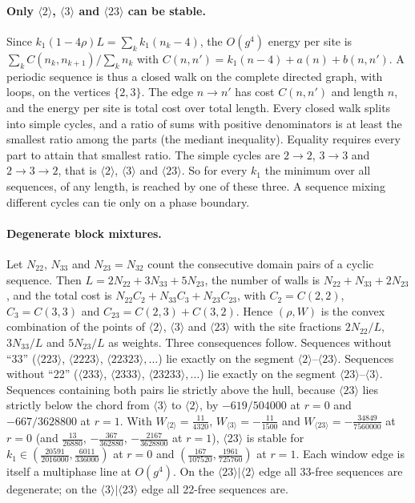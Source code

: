 \paragraph*{Only $\langle2\rangle$, $\langle3\rangle$ and $\langle23\rangle$ can be stable.}
Since $k_1(1-4\rho)L=\sum_k k_1(n_k-4)$, the $O(g^4)$ energy per site is $\sum_k C(n_k,n_{k+1})/\sum_k n_k$ with
$C(n,n')=k_1(n-4)+a(n)+b(n,n')$. A periodic sequence is thus a closed walk on the complete directed graph, with
loops, on the vertices $\{2,3\}$. The edge $n\to n'$ has cost $C(n,n')$ and length $n$, and the energy per site is
total cost over total length. Every closed walk splits into simple cycles, and a ratio of sums with positive
denominators is at least the smallest ratio among the parts (the mediant inequality). Equality requires every part
to attain that smallest ratio. The simple cycles are $2\to2$, $3\to3$ and $2\to3\to2$, that is $\langle2\rangle$,
$\langle3\rangle$ and $\langle23\rangle$. So for every $k_1$ the minimum over all sequences, of any length, is
reached by one of these three. A sequence mixing different cycles can tie only on a phase boundary.

\paragraph*{Degenerate block mixtures.}
Let $N_{22}$, $N_{33}$ and $N_{23}=N_{32}$ count the consecutive domain pairs of a cyclic sequence. Then
$L=2N_{22}+3N_{33}+5N_{23}$, the number of walls is $N_{22}+N_{33}+2N_{23}$, and the total cost is
$N_{22}C_{2}+N_{33}C_{3}+N_{23}C_{23}$, with $C_2=C(2,2)$, $C_3=C(3,3)$ and $C_{23}=C(2,3)+C(3,2)$. Hence
$(\rho,W)$ is the convex combination of the points of $\langle2\rangle$, $\langle3\rangle$ and $\langle23\rangle$
with the site fractions $2N_{22}/L$, $3N_{33}/L$ and $5N_{23}/L$ as weights. Three consequences follow.
Sequences without ``33'' ($\langle223\rangle$, $\langle2223\rangle$, $\langle22323\rangle,\dots$) lie exactly on the
segment $\langle2\rangle$--$\langle23\rangle$. Sequences without ``22'' ($\langle233\rangle$, $\langle2333\rangle$,
$\langle23233\rangle,\dots$) lie exactly on the segment $\langle23\rangle$--$\langle3\rangle$. Sequences containing
both pairs lie strictly above the hull, because $\langle23\rangle$ lies strictly below the chord from
$\langle3\rangle$ to $\langle2\rangle$, by $-619/504000$ at $r=0$ and $-667/3628800$ at $r=1$.
With $W_{\langle2\rangle}=\tfrac{11}{4320}$, $W_{\langle3\rangle}=-\tfrac{11}{1500}$ and
$W_{\langle23\rangle}=-\tfrac{34849}{7560000}$ at $r=0$ (and $\tfrac{13}{26880}$, $-\tfrac{367}{362880}$,
$-\tfrac{2167}{3628800}$ at $r=1$), $\langle23\rangle$ is stable for
$k_1\in(\tfrac{20591}{2016000},\tfrac{6011}{336000})$ at $r=0$ and $(\tfrac{167}{107520},\tfrac{1961}{725760})$ at
$r=1$. Each window edge is itself a multiphase line at $O(g^4)$. On the $\langle23\rangle|\langle2\rangle$ edge all
33-free sequences are degenerate; on the $\langle3\rangle|\langle23\rangle$ edge all 22-free sequences are.

